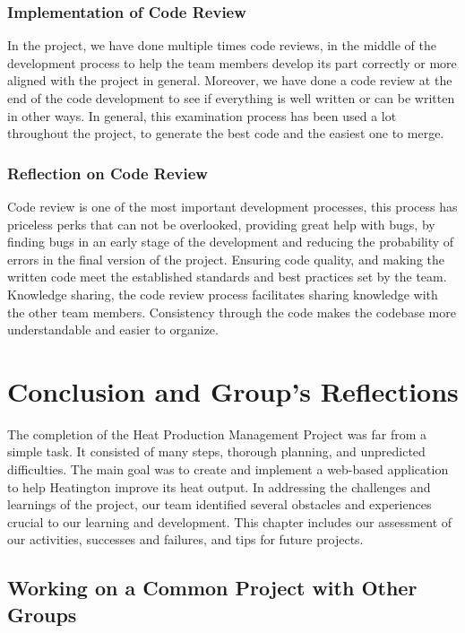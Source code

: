 \documentclass[12pt]{report}
\begin{document}
\subsection*{Implementation of Code Review}

In the project, we have done multiple times code reviews, in the middle of the development process to help the 
team members develop its part correctly or more aligned with the project in general. Moreover, we have done a 
code review at the end of the code development to see if everything is well written or can be written in other ways. 
In general, this examination process has been used a lot throughout the project, to generate the best code and the 
easiest one to merge.

\subsection*{Reflection on Code Review}

Code review is one of the most important development processes, this process has priceless perks that can not be overlooked, 
providing great help with bugs, by finding bugs in an early stage of the development and reducing the probability of errors in 
the final version of the project. Ensuring code quality, and making the written code meet the established standards and best 
practices set by the team. Knowledge sharing, the code review process facilitates sharing knowledge with the other team members. 
Consistency through the code makes the codebase more understandable and easier to organize.


\chapter{Conclusion and Group's Reflections}

The completion of the Heat Production Management Project was far from a simple task. 
It consisted of many steps, thorough planning, and unpredicted difficulties. The main goal was to create and implement
 a web-based application to help Heatington improve its heat output. In addressing the challenges and 
 learnings of the project, our team identified several obstacles and experiences crucial to our learning and development. 
 This chapter includes our assessment of our activities, successes and failures, and tips for future projects.

\section{Working on a Common Project with Other Groups}
\end{document}

